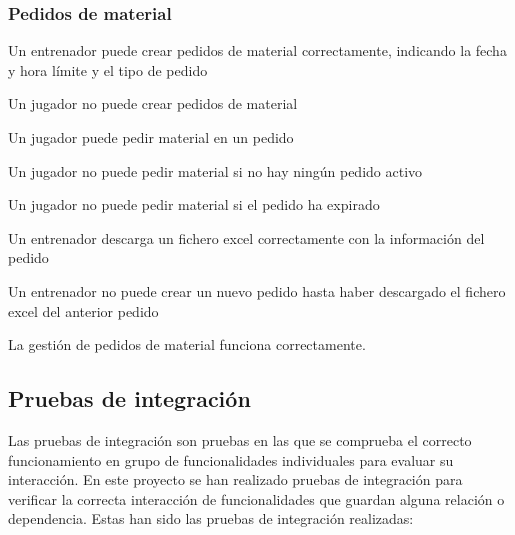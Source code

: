 \subsubsection{Pedidos de material}
\begin{description}[
    labelindent=2em,
    leftmargin=!,
    labelwidth=1.5cm,
    labelsep=1em,
    font=\normalfont
  ]
  \item[PU-35:] Un entrenador puede crear pedidos de material correctamente, indicando la fecha y hora límite y el tipo de pedido
  \item[PU-36:] Un jugador no puede crear pedidos de material
  \item[PU-37:] Un jugador puede pedir material en un pedido
  \item[PU-38:] Un jugador no puede pedir material si no hay ningún pedido activo
  \item[PU-39:] Un jugador no puede pedir material si el pedido ha expirado
  \item[PU-40:] Un entrenador descarga un fichero excel correctamente con la información del pedido
  \item[PU-41:] Un entrenador no puede crear un nuevo pedido hasta haber descargado el fichero excel del anterior pedido
  \item[\textbf{Resultado obtenido:}] La gestión de pedidos de material funciona correctamente.
\end{description}

\subsection{Pruebas de integración}

Las pruebas de integración son pruebas en las que se comprueba el correcto funcionamiento en grupo de funcionalidades individuales para evaluar su interacción. En este proyecto se han realizado pruebas de integración para verificar la correcta interacción de funcionalidades que guardan alguna relación o dependencia. Estas han sido las pruebas de integración realizadas:

